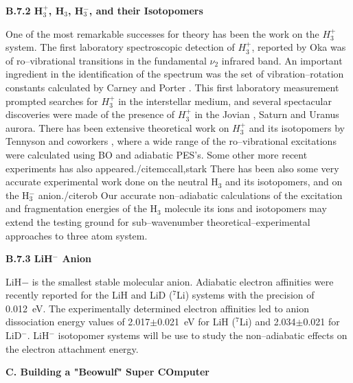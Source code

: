 \vspace{2mm}
\noindent
{\bf B.7.2 
H$_3^+$, H$_3$, H$_3^-$, and their Isotopomers}



One of the most remarkable successes
for theory has been the work on the $H_3^{+}$
system. The first laboratory spectroscopic detection of  $H_3^{+}$,
reported by Oka \cite{ref:k35} was of ro--vibrational transitions in the
fundamental $\nu_2$ infrared band. An important ingredient in the
identification of the spectrum was the set of vibration--rotation
constants calculated by Carney and Porter \cite{ref:k36}. This first
laboratory measurement prompted searches for $H_3^{+}$ in the interstellar
medium, and several spectacular discoveries were made of the presence
of $H_3^{+}$ in the Jovian \cite{ref:k41}, Saturn \cite{ref:k44} and
Uranus \cite{ref:k45} aurora. There has been 
extensive theoretical
work on $H_3^{+}$ and its isotopomers by Tennyson and coworkers
\cite{ref:ten2,ref:ten3,ref:ten4,ref:ten5,ref:ten6,ref:ten7,ref:ten8,%
ref:ten9}, where a wide range of the ro--vibrational excitations were
calculated using BO and adiabatic PES's. Some other
more recent experiments has also appeared./cite{mccall,stark} 
There has been also some very accurate experimental work
done on the neutral H$_3$ and its 
isotopomers,\cite{azinovic,muller} and on the H$_3^-$ anion./cite{rob}
Our accurate non--adiabatic calculations of the excitation
and fragmentation energies of the H$_3$ molecule its
ions and isotopomers may extend the testing ground for
sub--wavenumber theoretical--experimental approaches to 
three atom system.



\vspace{2mm}
\noindent
{\bf B.7.3
LiH$^-$ Anion}

LiH$-$ is the smallest stable molecular anion.
Adiabatic electron affinities were recently reported for 
the LiH and LiD ($^7$Li) systems with the precision
of 0.012~eV.\cite{sarkas}
The experimentally determined electron affinities led to
anion dissociation energy values of 2.017$\pm$0.021~eV 
for LiH ($^7$Li)
and 2.034$\pm$0.021 for LiD$^-$.
LiH$^-$ isotopomer systems will be use to study
the non--adiabatic effects on the electron attachment
energy.



\vspace{2mm}
\noindent
{\bf C. Building a "Beowulf" Super COmputer}


